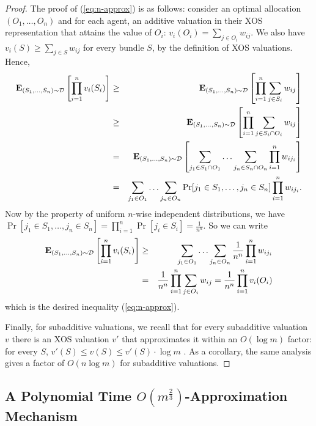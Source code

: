 \documentclass{article}
\newcommand{\E}{\mbox{\bf E}}
\newcommand{\cD}{{\mathcal D}}
\begin{document}
\begin{proof}
The proof of (\ref{eq:n-approx}) is as follows: consider an optimal allocation $(O_1,\ldots,O_n)$ and for each agent, an additive valuation in their XOS representation that attains the value of $O_i$:  $v_i(O_i) = \sum_{j \in O_i} w_{ij}$. We also have 
$v_i(S) \geq \sum_{j \in S} w_{ij}$ for every bundle $S$, by the definition of XOS valuations. Hence,
\begin{eqnarray*}
\E_{(S_1,\ldots,S_n) \sim \cD}\left[\prod_{i=1}^{n} v_i(S_i) \right] 
& \geq & \E_{(S_1,\ldots,S_n) \sim \cD}\left[\prod_{i=1}^{n} \sum_{j \in S_i} w_{ij} \right]  \\
& \geq & \E_{(S_1,\ldots,S_n) \sim \cD}\left[\prod_{i=1}^{n} \sum_{j \in S_i \cap O_i} w_{ij} \right]  \\
& = & \E_{(S_1,\ldots,S_n) \sim \cD}\left[\sum_{j_1 \in S_1 \cap O_1} \ldots \sum_{j_n \in S_n \cap O_n} \prod_{i=1}^{n} w_{i j_i} \right]  \\
& = & \sum_{j_1 \in O_1} \ldots \sum_{j_n \in O_n} \Pr[j_1 \in S_1, \ldots, j_n \in S_n] \prod_{i=1}^{n} w_{i j_i}.  \\
\end{eqnarray*}
Now by the property of uniform $n$-wise independent distributions, we have $\Pr[j_1 \in S_1, \ldots, j_n \in S_n] = \prod_{i=1}^{n} \Pr[j_i \in S_i] = \frac{1}{n^n}$. So we can write
\begin{eqnarray*}
\E_{(S_1,\ldots,S_n) \sim \cD}\left[\prod_{i=1}^{n} v_i(S_i) \right] 
& \geq & \sum_{j_1 \in O_1} \ldots \sum_{j_n \in O_n} \frac{1}{n^n} \prod_{i=1}^{n} w_{i j_i} \\
& = & \frac{1}{n^n} \prod_{i=1}^{n} \sum_{j \in O_i} w_{ij} = \frac{1}{n^n} \prod_{i=1}^{n} v_i(O_i)
\end{eqnarray*}
which is the desired inequality (\ref{eq:n-approx}).

Finally, for subadditive valuations, we recall that for every subadditive valuation $v$ there is an XOS valuation $v'$ that approximates it within an $O(\log m)$ factor: for every $S$, $v'(S)\leq v(S)\leq v'(S) \cdot \log m$ \cite{D07}. As a corollary, the same analysis gives a factor of $O(n \log m)$ for subadditive valuations.
\end{proof}



\subsection{A Polynomial Time \texorpdfstring{$O(m^{\frac 2 3})$}{O(m\^{}(2/3))}-Approximation Mechanism}\label{subsec-approx-m23}
\end{document}

